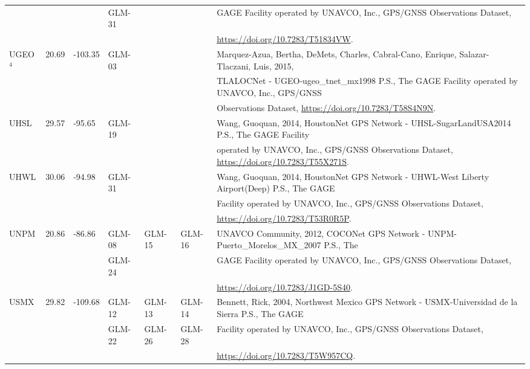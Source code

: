 \begin{landscape}
\begin{longtable}{llllllp{12cm}}
    &&& GLM-31 &&& GAGE Facility operated by UNAVCO, Inc., GPS/GNSS Observations Dataset, \\
    &&&&&& \url{https://doi.org/10.7283/T51834VW}. \\\hline
    \multirow{3}{*}{UGEO\hyperlink{Marquez}{${}^4$}} & \multirow{3}{*}{20.69} & \multirow{3}{*}{-103.35} & \multirow{3}{*}{GLM-03} & & & Marquez-Azua, Bertha, DeMets, Charles, Cabral-Cano, Enrique, Salazar-Tlaczani, Luis, 2015, \\
    &&&&&& TLALOCNet - UGEO-ugeo\_tnet\_mx1998 P.S., The GAGE Facility operated by UNAVCO, Inc., GPS/GNSS \\
    &&&&&& Observations Dataset, \url{https://doi.org/10.7283/T58S4N9N}. \\\hline
    \multirow{2}{*}{UHSL} & \multirow{2}{*}{29.57} & \multirow{2}{*}{-95.65} & \multirow{2}{*}{GLM-19} & & & Wang, Guoquan, 2014, HoustonNet GPS Network - UHSL-SugarLandUSA2014 P.S., The GAGE Facility \\
    &&&&&& operated by UNAVCO, Inc., GPS/GNSS Observations Dataset, \url{https://doi.org/10.7283/T55X271S}.\\\hline
    \multirow{3}{*}{UHWL} & \multirow{3}{*}{30.06} & \multirow{3}{*}{-94.98} & \multirow{3}{*}{GLM-31} & & & Wang, Guoquan, 2014, HoustonNet GPS Network - UHWL-West Liberty Airport(Deep) P.S., The GAGE \\
    &&&&&& Facility operated by UNAVCO, Inc., GPS/GNSS Observations Dataset,  \\
    &&&&&& \url{https://doi.org/10.7283/T53R0R5P}. \\\hline
    \multirow{3}{*}{UNPM} & \multirow{3}{*}{20.86} & \multirow{3}{*}{-86.86} & GLM-08 & GLM-15 & GLM-16  & UNAVCO Community, 2012, COCONet GPS Network - UNPM-Puerto\_Morelos\_MX\_2007 P.S., The \\
    &&& GLM-24 &&& GAGE Facility operated by UNAVCO, Inc., GPS/GNSS Observations Dataset, \\
    &&&&&& \url{https://doi.org/10.7283/J1GD-5S40}.\\\hline
    \multirow{3}{*}{USMX} & \multirow{3}{*}{29.82} & \multirow{3}{*}{-109.68} & GLM-12 & GLM-13 & GLM-14  & Bennett, Rick, 2004, Northwest Mexico GPS Network - USMX-Universidad de la Sierra P.S., The GAGE \\
    &&& GLM-22 & GLM-26 & GLM-28 & Facility operated by UNAVCO, Inc., GPS/GNSS Observations Dataset, \\
    &&&&&& \url{https://doi.org/10.7283/T5W957CQ}.\\\hline

\end{longtable}
\end{landscape}
